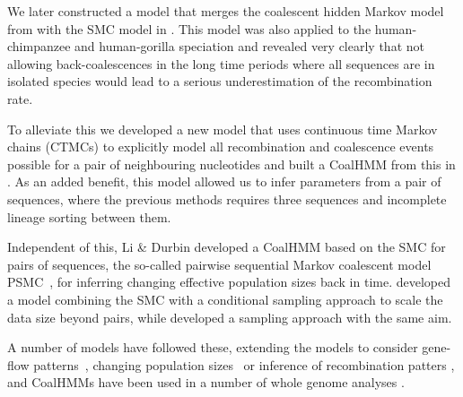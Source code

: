 \documentclass[graybox]{svmult}
\begin{document}
We later constructed a model that merges the coalescent hidden Markov model from \citet{Hobolth:2007gz} with the SMC model in \citet{Dutheil:2009dt}. This model was also applied to the human-chimpanzee and human-gorilla speciation and revealed very clearly that not allowing back-coalescences in the long time periods where all sequences are in isolated species would lead to a serious underestimation of the recombination rate.

To alleviate this we developed a new model that uses continuous time Markov chains (CTMCs) to explicitly model all recombination and coalescence events possible for a pair of neighbouring nucleotides and built a CoalHMM from this in \citet{Mailund:2011dv}. As an added benefit, this model allowed us to infer parameters from a pair of sequences, where the previous methods requires three sequences and incomplete lineage sorting between them.

Independent of this, Li \& Durbin developed a CoalHMM based on the SMC for pairs of sequences, the so-called pairwise sequential Markov coalescent model PSMC~\cite{Li:2011ez}, for inferring changing effective population sizes back in time. \citet{Paul:2011gv} developed a model combining the SMC with a conditional sampling approach to scale the data size beyond pairs, while \citet{Rasmussen:2014cq} developed a sampling approach with the same aim.

A number of models have followed these, extending the models to consider gene-flow patterns~\cite{Steinrucken:2013kb,Mailund:2012ew}, changing population sizes~\cite{Sheehan:2013ib,Schiffels:2014cu} or inference of recombination patters \cite{Munch:2014cb}, and CoalHMMs have been used in a number of whole genome analyses \cite{Locke:2011gn,Scally:2012ik,PradoMartinez:2013dn,Prufer:2012eaa,Miller:2012bx}.




\end{document}
